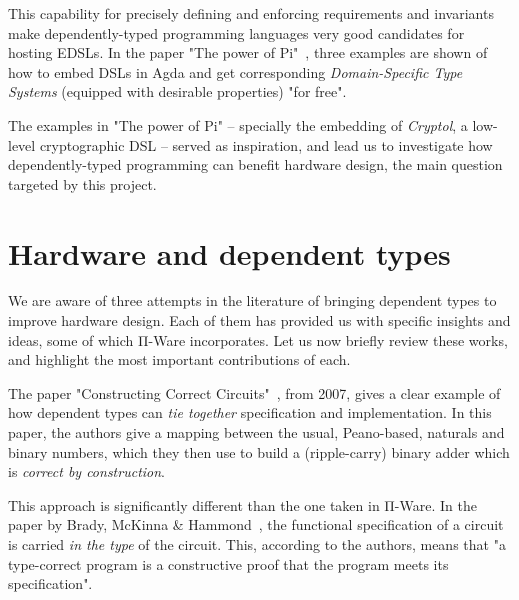            \begin{center}
            \end{center}

            This capability for precisely defining and enforcing requirements and invariants make
            dependently-typed programming languages very good candidates for hosting \acp{EDSL}.
            In the paper "The power of Pi"~\cite{power-pi}, three examples are shown of how to
            embed \acp{DSL} in Agda and get corresponding \emph{Domain-Specific Type Systems}
            (equipped with desirable properties) "for free".

            The examples in "The power of Pi" – specially the embedding of \emph{Cryptol},
            a low-level cryptographic \ac{DSL} – served as inspiration,
            and lead us to investigate how dependently-typed programming can benefit hardware
            design, the main question targeted by this project.



    \section{Hardware and dependent types}
    \label{sec:hardware-dtp}
        We are aware of three attempts in the literature of bringing dependent types to improve hardware design.
        Each of them has provided us with specific insights and ideas, some of which Π-Ware incorporates.
        Let us now briefly review these works, and highlight the most important contributions of each.

        The paper "Constructing Correct Circuits"~\cite{brady-constructing}, from 2007,
        gives a clear example of how dependent types can \emph{tie together} specification and implementation.
        In this paper, the authors give a mapping between the usual, Peano-based, naturals and binary numbers,
        which they then use to build a (ripple-carry) binary adder which is \emph{correct by construction}.

        This approach is significantly different than the one taken in Π-Ware.
        In the paper by Brady, McKinna \& Hammond~\cite{brady-constructing},
        the functional specification of a circuit is carried \emph{in the type} of the circuit.
        This, according to the authors, means that
        "a type-correct program is a constructive proof that the program meets its specification".

